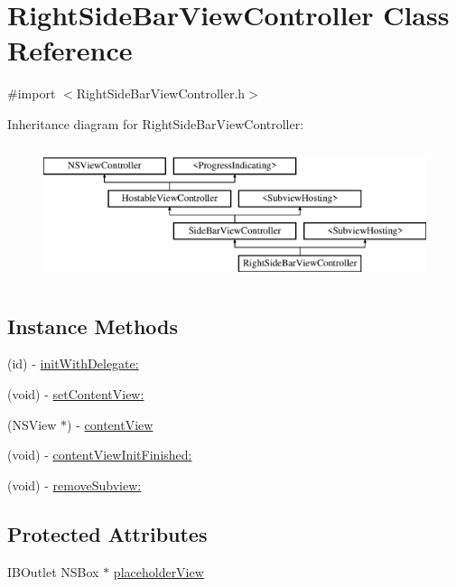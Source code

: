 \hypertarget{interface_right_side_bar_view_controller}{\section{Right\-Side\-Bar\-View\-Controller Class Reference}
\label{interface_right_side_bar_view_controller}
}


{\ttfamily \#import $<$Right\-Side\-Bar\-View\-Controller.\-h$>$}

Inheritance diagram for Right\-Side\-Bar\-View\-Controller\-:\begin{figure}[H]
\begin{center}
\leavevmode
\includegraphics[height=4.000000cm]{interface_right_side_bar_view_controller}
\end{center}
\end{figure}
\subsection*{Instance Methods}
\begin{DoxyCompactItemize}
\item 
(id) -\/ \hyperlink{interface_right_side_bar_view_controller_a31987d71b58e0520588676a4f6896d2c}{init\-With\-Delegate\-:}
\item 
(void) -\/ \hyperlink{interface_right_side_bar_view_controller_a436ad518c07abe22d863c34f19e1eb09}{set\-Content\-View\-:}
\item 
(N\-S\-View $\ast$) -\/ \hyperlink{interface_right_side_bar_view_controller_a90ebec97204051c7d79f9856ac49e681}{content\-View}
\item 
(void) -\/ \hyperlink{interface_right_side_bar_view_controller_a0bd73ec236f8055ac6566b39ddf66add}{content\-View\-Init\-Finished\-:}
\item 
(void) -\/ \hyperlink{interface_right_side_bar_view_controller_afc97bbb7e9b0d2f6b9fd995ada16f4a1}{remove\-Subview\-:}
\end{DoxyCompactItemize}
\subsection*{Protected Attributes}
\begin{DoxyCompactItemize}
\item 
I\-B\-Outlet N\-S\-Box $\ast$ \hyperlink{interface_right_side_bar_view_controller_a6e541abf083c8f83993f4f037ca3de6f}{placeholder\-View}
\end{DoxyCompactItemize}
